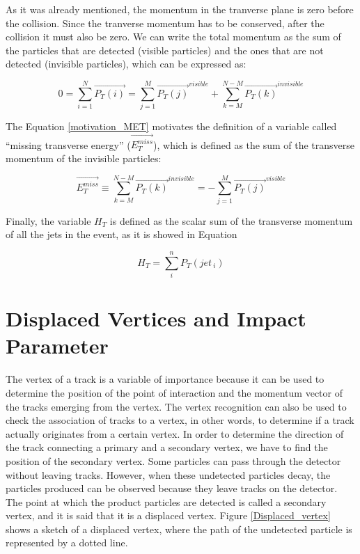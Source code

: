  As it was already mentioned, the momentum in the tranverse plane is zero before the collision. Since the tranverse momentum has to be conserved, after the collision it must also be zero. We can write the total momentum as the sum of the particles that are detected (visible particles) and the ones that are not detected (invisible particles), which can be expressed as:
 
 \begin{equation}
  0 = \sum_{i=1}^N \vec{P_T(i)} = \sum_{j=1}^M \vec{P_T(j)}^{visible} + \sum_{k=M}^{N-M} \vec{P_T(k)}^{invisible}
  \label{motivation_MET}
 \end{equation}

 The Equation \ref{motivation_MET} motivates the definition of a variable called ``missing transverse energy'' ($\vec{E_T^{miss}}$), which is defined as the sum of the transverse momentum of the invisible
 particles:
 
 \begin{equation}
  \vec{E_T^{miss}} \equiv \sum_{k=M}^{N-M}\vec{P_T(k)}^{invisible} = - \sum_{j=1}^M  \vec{P_T(j)}^{visible}
 \end{equation}

Finally, the variable $H_T$ is defined as the scalar sum of the transverse momentum of all the jets in the event, as it is showed in Equation

\begin{equation}
H_T = \sum_i^n P_T(jet_{\ i})
\end{equation}
 
 \section{Displaced Vertices and Impact Parameter}
The vertex of a track is a variable of importance because it can be used to determine the position of the point of interaction and the momentum vector of the tracks emerging from the vertex. The 
vertex recognition can also be used to check the association of tracks to a vertex, in other words, to determine if a track actually originates from a certain vertex. In order to determine the direction of the track connecting a primary and a secondary vertex, we have to find the position of the secondary vertex. Some particles can pass through the detector without leaving tracks. However,
when these undetected particles decay, the particles produced can be observed because they leave tracks on the detector. The point at which the product particles are detected is called a secondary 
vertex, and it is said that it is a displaced vertex. Figure \ref{Displaced_vertex} shows a sketch of a displaced vertex, where the path of the undetected particle is represented by a dotted line.

